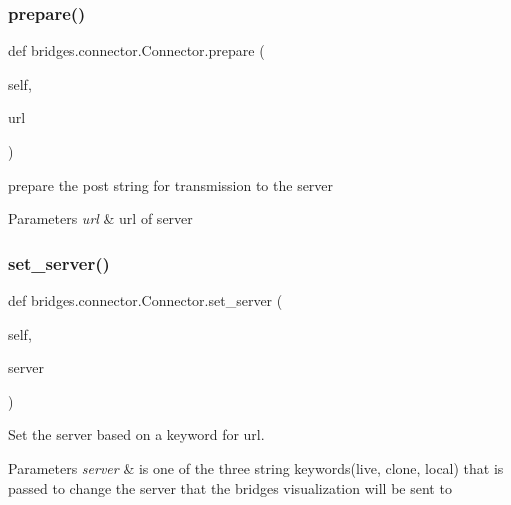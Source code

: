 \subsubsection{\texorpdfstring{prepare()}{prepare()}}
{\footnotesize\ttfamily def bridges.\+connector.\+Connector.\+prepare (\begin{DoxyParamCaption}\item[{}]{self,  }\item[{}]{url }\end{DoxyParamCaption})}



prepare the post string for transmission to the server 


\begin{DoxyParams}{Parameters}
{\em url} & url of server \\
\hline
\end{DoxyParams}
\mbox{\label{classbridges_1_1connector_1_1_connector_aabe66803d7701015138288c5ceeba81f}} 
\subsubsection{\texorpdfstring{set\+\_\+server()}{set\_server()}}
{\footnotesize\ttfamily def bridges.\+connector.\+Connector.\+set\+\_\+server (\begin{DoxyParamCaption}\item[{}]{self,  }\item[{}]{server }\end{DoxyParamCaption})}



Set the server based on a keyword for url. 


\begin{DoxyParams}{Parameters}
{\em server} & is one of the three string keywords(\textquotesingle{}live\textquotesingle{}, \textquotesingle{}clone\textquotesingle{}, \textquotesingle{}local\textquotesingle{}) that is passed to change the server that the bridges visualization will be sent to \\
\hline
\end{DoxyParams}
\mbox{\label{classbridges_1_1connector_1_1_connector_a6cfa754618584132754cea9a8bde5282}} 
